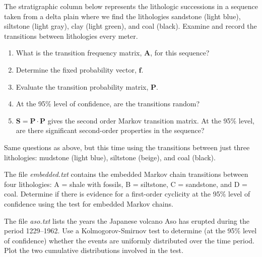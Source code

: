 \begin{problem}
The stratigraphic column below represents the lithologic successions in a sequence taken 
from a delta plain where we find the lithologies sandstone (light blue), siltstone (light gray), clay (light green), 
and coal (black).  Examine and record the transitions between lithologies every meter.

\begin{enumerate}[label=\alph*)]
\item What is the transition frequency matrix, $\mathbf{A}$, for this sequence?

\item Determine the fixed probability vector, $\mathbf{f}$.

\item Evaluate the transition probability matrix, $\mathbf{P}$.

\item At the 95\% level of confidence, are the transitions random?

\item $\mathbf{S = P \cdot P}$ gives the second order Markov transition matrix.  At the 95\% level, are there significant 
second-order properties in the sequence?
\end{enumerate}
\end{problem}

\begin{problem}
	Same questions as above, but this time using the transitions between just three lithologies:
	mudstone (light blue), siltstone (beige), and coal (black).
\end{problem}

\begin{problem}
	The file \emph{embedded.txt} contains the embedded Markov chain transitions between four lithologies:
	A = shale with fossils, B = siltstone, C = sandstone, and D = coal.  Determine if there is evidence
	for a first-order cyclicity at the 95\% level of confidence using the test for embedded Markov chains.
\end{problem}

\begin{problem}
The file \emph{aso.txt} lists the years the Japanese volcano Aso has erupted during the period 1229--1962.  
Use a Kolmogorov-Smirnov test to determine (at the 95\% level of confidence) whether the 
events are uniformly distributed over the time period. Plot the two cumulative distributions involved in the test.
\end{problem}

